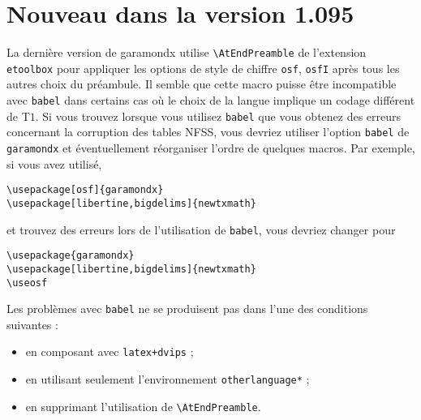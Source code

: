 \documentclass[12pt,english,french]{article}
\begin{document}
\section{Nouveau dans la version 1.095\label{opt}}%


La dernière version de \textsf{garamondx} utilise \verb+\AtEndPreamble+ de l'extension \texttt{etoolbox} pour appliquer les options de style de chiffre \texttt{osf}, \texttt{osfI} après tous les autres choix du préambule. Il semble que cette macro puisse être incompatible avec \texttt{babel} dans certains cas où le choix de la langue implique un codage différent de T$1$. Si vous trouvez lorsque vous utilisez \texttt{babel} que vous obtenez des erreurs concernant la corruption des tables NFSS, vous devriez utiliser l'option \texttt{babel} de \texttt{garamondx} et éventuellement réorganiser l'ordre de quelques macros. Par exemple, si vous avez utilisé,

\begin{verbatim}
\usepackage[osf]{garamondx}
\usepackage[libertine,bigdelims]{newtxmath}
\end{verbatim} 
et trouvez des erreurs lors de l'utilisation de \texttt{babel}, vous devriez changer pour
\begin{verbatim}
\usepackage{garamondx}
\usepackage[libertine,bigdelims]{newtxmath}
\useosf
\end{verbatim}
Les problèmes avec \texttt{babel} ne se produisent pas dans l'une des conditions suivantes :
\begin{itemize}
\item
en composant avec \texttt{latex+dvips} ;
\item 
en utilisant seulement l'environnement \verb+otherlanguage*+ ;
\item 
en supprimant l'utilisation de \verb+\AtEndPreamble+.
\end{itemize}
\end{document}
